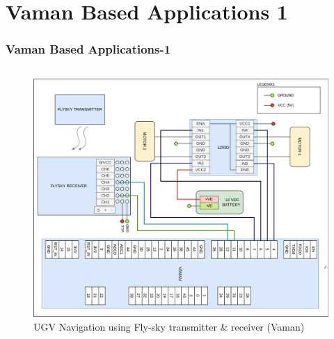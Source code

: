 \documentclass{beamer}
\begin{document}
\section{Vaman Based Applications 1}
\begin{frame}
\frametitle{Vaman Based Applications-1}
\begin{columns}
	\begin{figure}[h!]
  		\centering
  		\includegraphics[width=\linewidth]{./figs/Wiring_UGV_flysky_Vaman.png}
  		\caption{UGV Navigation using Fly-sky transmitter \& receiver (Vaman)}
  		\label{Wiring_UGV_flysky_Vaman}
	\end{figure}
\end{columns}
\end{frame}
\end{document}
